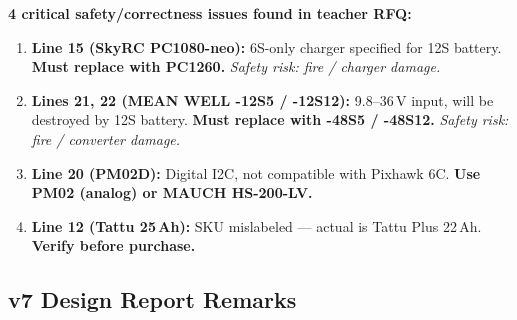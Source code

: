 \documentclass[11pt,a4paper]{article}
\begin{document}
\textbf{4 critical safety/correctness issues found in teacher RFQ:}
\begin{enumerate}
  \item \textbf{Line 15 (SkyRC PC1080-neo):} 6S-only charger specified for 12S battery. \textbf{Must replace with PC1260.} \textit{Safety risk: fire / charger damage.}
  \item \textbf{Lines 21, 22 (MEAN WELL -12S5 / -12S12):} 9.8--36\,V input, will be destroyed by 12S battery. \textbf{Must replace with -48S5 / -48S12.} \textit{Safety risk: fire / converter damage.}
  \item \textbf{Line 20 (PM02D):} Digital I2C, not compatible with Pixhawk 6C. \textbf{Use PM02 (analog) or MAUCH HS-200-LV.}
  \item \textbf{Line 12 (Tattu 25\,Ah):} SKU mislabeled --- actual is Tattu Plus 22\,Ah. \textbf{Verify before purchase.}
\end{enumerate}

\subsection{v7 Design Report Remarks}
\end{document}

